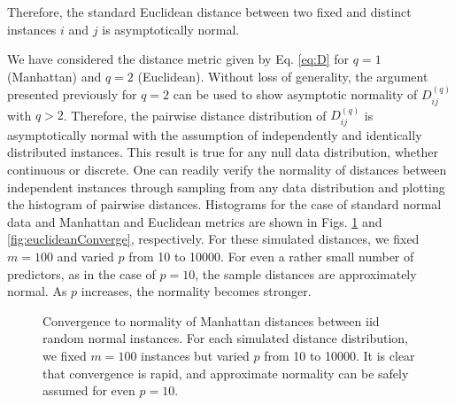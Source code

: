 \documentclass[10pt,letterpaper]{article}\usepackage[]{graphicx}\usepackage[]{color}
\begin{document}
Therefore, the standard Euclidean distance between two fixed and distinct instances $i$ and $j$ is asymptotically normal.

We have considered the distance metric given by Eq. \ref{eq:D} for $q=1$ (Manhattan) and $q=2$ (Euclidean). Without loss of generality, the argument presented previously for $q=2$ can be used to show asymptotic normality of $D^{(q)}_{ij}$ with $q>2$. Therefore, the pairwise distance distribution of $D^{(q)}_{ij}$ is asymptotically normal with the assumption of independently and identically distributed instances. This result is true for any null data distribution, whether continuous or discrete. One can readily verify the normality of distances between independent instances through sampling from any data distribution and plotting the histogram of pairwise distances. Histograms for the case of standard normal data and Manhattan and Euclidean metrics are shown in Figs. \ref{fig:manhattanConverge} and \ref{fig:euclideanConverge}, respectively. For these simulated distances, we fixed $m=100$ and varied $p$ from 10 to 10000. For even a rather small number of predictors, as in the case of $p=10$, the sample distances are approximately normal. As $p$ increases, the normality becomes stronger.

\begin{figure}[ht!]
\centering
		\caption{Convergence to normality of Manhattan distances between iid random normal instances. For each simulated distance distribution, we fixed $m=100$ instances but varied $p$ from 10 to 10000. It is clear that convergence is rapid, and approximate normality can be safely assumed for even $p=10$.}\label{fig:manhattanConverge}
\end{figure} 
\end{document}

